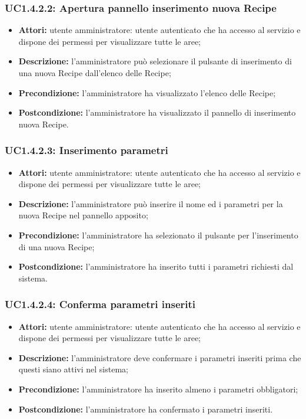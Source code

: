 \subsubsection{UC1.4.2.2: Apertura pannello inserimento nuova Recipe}

\begin{itemize}
   	\item \textbf{Attori:} utente amministratore: utente autenticato che ha accesso al servizio e dispone dei permessi per visualizzare tutte le aree;
    \item \textbf{Descrizione:} l'amministratore può selezionare il pulsante di inserimento di una nuova Recipe dall'elenco delle Recipe;
    \item \textbf{Precondizione:} l'amministratore ha visualizzato l'elenco delle Recipe;
    \item \textbf{Postcondizione:} l'amministratore ha visualizzato il pannello di inserimento nuova Recipe.
\end{itemize}

\subsubsection{UC1.4.2.3: Inserimento parametri}

\begin{itemize}
   	\item \textbf{Attori:} utente amministratore: utente autenticato che ha accesso al servizio e dispone dei permessi per visualizzare tutte le aree;
    \item \textbf{Descrizione:} l'amministratore può inserire il nome ed i parametri per la nuova Recipe nel pannello apposito;
    \item \textbf{Precondizione:} l'amministratore ha selezionato il pulsante per l'inserimento di una nuova Recipe;
    \item \textbf{Postcondizione:} l'amministratore ha inserito tutti i parametri richiesti dal sistema.
\end{itemize}

\subsubsection{UC1.4.2.4: Conferma parametri inseriti}

\begin{itemize}
  	\item \textbf{Attori:} utente amministratore: utente autenticato che ha accesso al servizio e dispone dei permessi per visualizzare tutte le aree;
    \item \textbf{Descrizione:} l'amministratore deve confermare i parametri inseriti prima che questi siano attivi nel sistema;
    \item \textbf{Precondizione:} l'amministratore ha inserito almeno i parametri obbligatori;
    \item \textbf{Postcondizione:} l'amministratore ha confermato i parametri inseriti.
\end{itemize}

